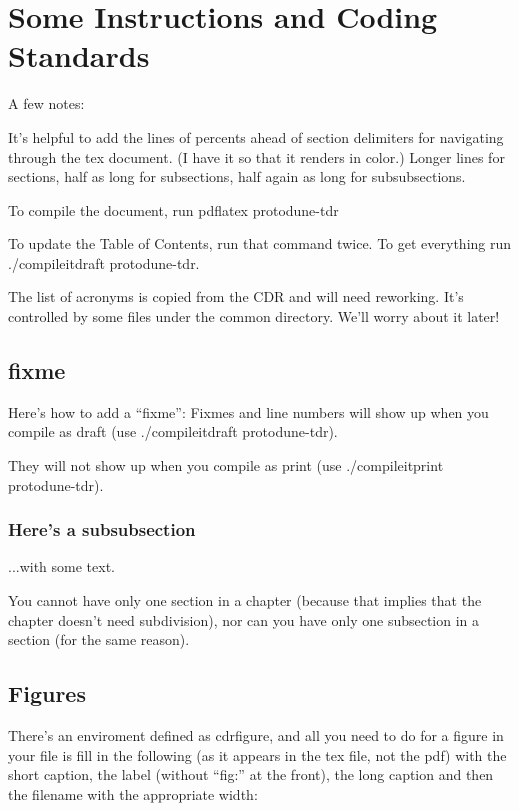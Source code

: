 
\section{Some Instructions and Coding Standards}

A few notes:

It's helpful to add the lines of percents ahead of section delimiters for navigating through the tex document. (I have it so that it renders in color.)  Longer lines for sections, half as long for subsections, half again as long for subsubsections.

To compile the document, run pdflatex protodune-tdr

To update the Table of Contents, run that command twice.  To get everything run ./compileitdraft protodune-tdr.

The list of acronyms is copied from the CDR and will need reworking. It's controlled by some files under the common directory. We'll worry about it later!

\subsection{fixme}
Here's how to add a ``fixme'':
Fixmes and line numbers will show up when you compile as draft (use ./compileitdraft protodune-tdr).

They will not show up when you compile as print (use ./compileitprint protodune-tdr).

\subsubsection{Here's a subsubsection}
...with some text.

You cannot have only one section in a chapter (because that implies that the chapter doesn't need subdivision), nor can you have only one subsection in a section (for the same reason).


\subsection{Figures}
There's an enviroment defined as cdrfigure, and all you need to do for a figure in your file is fill in the following (as it appears in the tex file, not the pdf) with the short caption, the label (without ``fig:'' at the front), the long caption and then the filename with the appropriate width:


